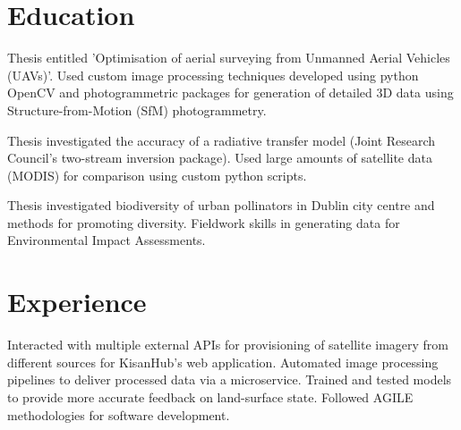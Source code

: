 \documentclass[]{JOC_CV}
\begin{document}
\hfill
\begin{minipage}[t]{0.66\textwidth}


\section{Education}\label{sec:education}

Thesis entitled 'Optimisation of aerial surveying from Unmanned Aerial Vehicles (UAVs)'.
Used custom image processing techniques developed using python OpenCV and photogrammetric packages for generation of detailed 3D data using Structure-from-Motion (SfM) photogrammetry.
\sectionsep

Thesis investigated the accuracy of a radiative transfer model (Joint Research Council's two-stream inversion package).
Used large amounts of satellite data (MODIS) for comparison using custom python scripts.
\sectionsep

Thesis investigated biodiversity of urban pollinators in Dublin city centre and methods for promoting diversity.
Fieldwork skills in generating data for Environmental Impact Assessments.
\sectionsep


\section{Experience}\label{sec:experience}

\linebreak
{}
Interacted with multiple external APIs for provisioning of satellite imagery from different sources for KisanHub's web application.
Automated image processing pipelines to deliver processed data via a microservice.
Trained and tested models to provide more accurate feedback on land-surface state.
Followed AGILE methodologies for software development.
\sectionsep


\end{minipage}
\end{document}
